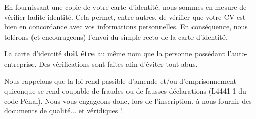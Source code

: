 En fournissant une copie de votre carte d'identité, nous sommes en mesure de vérifier ladite identité.
Cela permet, entre autres, de vérifier que votre CV est bien en concordance avec vos informations personnelles.
En conséquence, nous tolérons (et encourageons) l'envoi du simple recto de la carte d'identité.

La carte d'identité \textbf{doit être} au même nom que la personne possédant l'auto-entreprise. Des vérifications sont faites afin d'éviter tout abus.

Nous rappelons que la loi rend passible d'amende et/ou d'emprisonnement quiconque se rend coupable de fraudes ou de fausses déclarations (L4441-1 du code Pénal). Nous vous engageons donc, lors de l'inscription, à nous fournir des documents de qualité... et véridiques !